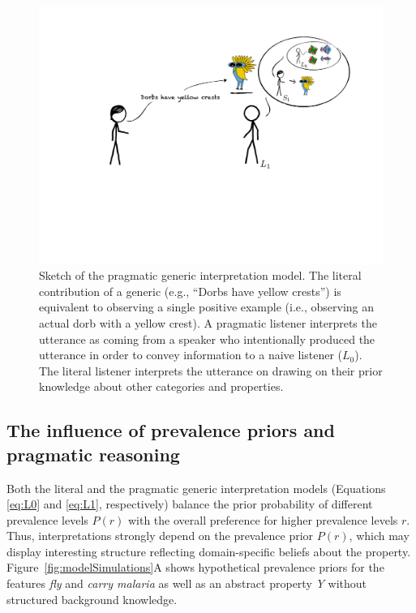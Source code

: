 \documentclass[floatsintext,doc]{apa6}
\begin{document}
\begin{figure}
\centering
\includegraphics{figs/cartoon.pdf}
\caption{\label{fig:cartoon}Sketch of the pragmatic generic interpretation model. The literal contribution of a generic (e.g., \enquote{Dorbs have yellow crests}) is equivalent to observing a single positive example (i.e., observing an actual dorb with a yellow crest). A pragmatic listener interprets the utterance as coming from a speaker who intentionally produced the utterance in order to convey information to a naive listener (\(L_0\)). The literal listener interprets the utterance on drawing on their prior knowledge about other categories and properties.}
\end{figure}

\hypertarget{the-influence-of-prevalence-priors-and-pragmatic-reasoning}{%
\subsection{The influence of prevalence priors and pragmatic reasoning}\label{the-influence-of-prevalence-priors-and-pragmatic-reasoning}}

Both the literal and the pragmatic generic interpretation models (Equations \ref{eq:L0} and \ref{eq:L1}, respectively) balance the prior probability of different prevalence levels \(P(r)\) with the overall preference for higher prevalence levels \(r\).
Thus, interpretations strongly depend on the prevalence prior \(P(r)\), which may display interesting structure reflecting domain-specific beliefs about the property.
Figure~\ref{fig:modelSimulations}A shows hypothetical prevalence priors for the features \emph{fly} and \emph{carry malaria} as well as an abstract property \emph{Y} without structured background knowledge.
\end{document}
